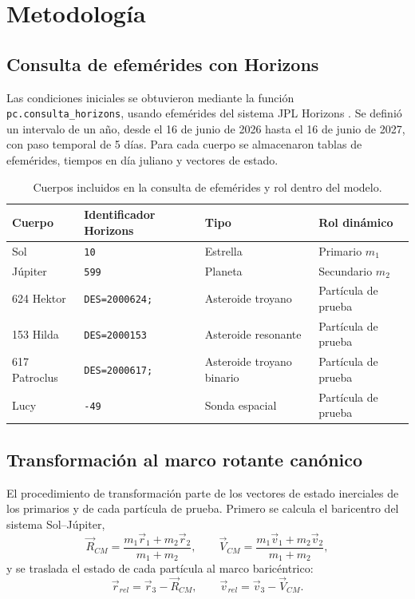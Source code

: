 \documentclass[12pt,a4paper]{article}
\begin{document}
\section{Metodología}
\subsection{Consulta de efemérides con Horizons}
Las condiciones iniciales se obtuvieron mediante la función \texttt{pc.consulta\_horizons}, usando efemérides del sistema JPL Horizons \cite{jpl_horizons,giorgini1996horizons}. Se definió un intervalo de un año, desde el 16 de junio de 2026 hasta el 16 de junio de 2027, con paso temporal de 5 días. Para cada cuerpo se almacenaron tablas de efemérides, tiempos en día juliano y vectores de estado.

\begin{table}[H]
\centering
\caption{Cuerpos incluidos en la consulta de efemérides y rol dentro del modelo.}
\label{tab:cuerpos}
\begin{tabular}{llll}
\toprule
\textbf{Cuerpo} & \textbf{Identificador Horizons} & \textbf{Tipo} & \textbf{Rol dinámico} \\
\midrule
Sol & \texttt{10} & Estrella & Primario \(m_1\) \\
Júpiter & \texttt{599} & Planeta & Secundario \(m_2\) \\
624 Hektor & \texttt{DES=2000624;} & Asteroide troyano & Partícula de prueba \\
153 Hilda & \texttt{DES=2000153} & Asteroide resonante & Partícula de prueba \\
617 Patroclus & \texttt{DES=2000617;} & Asteroide troyano binario & Partícula de prueba \\
Lucy & \texttt{-49} & Sonda espacial & Partícula de prueba \\
\bottomrule
\end{tabular}
\end{table}

\subsection{Transformación al marco rotante canónico}
El procedimiento de transformación parte de los vectores de estado inerciales de los primarios y de cada partícula de prueba. Primero se calcula el baricentro del sistema Sol--Júpiter,
\begin{equation}
\vec R_{CM}=\frac{m_1\vec r_1+m_2\vec r_2}{m_1+m_2},\qquad
\vec V_{CM}=\frac{m_1\vec v_1+m_2\vec v_2}{m_1+m_2},
\end{equation}
y se traslada el estado de cada partícula al marco baricéntrico:
\begin{equation}
\vec r_{rel}=\vec r_3-\vec R_{CM},\qquad \vec v_{rel}=\vec v_3-\vec V_{CM}.
\end{equation}
\end{document}
